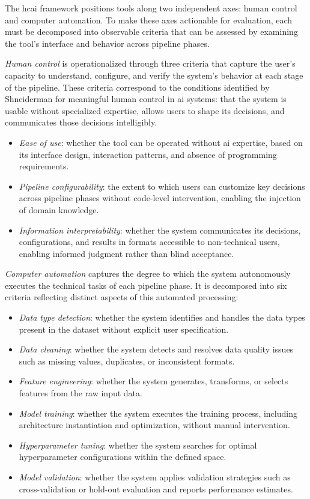 \documentclass[a4paper,twoside]{article}
\begin{document}
The \gls{hcai} framework positions tools along two independent axes: human
control and computer automation. To make these
axes actionable for evaluation, each must be decomposed into observable
criteria that can be assessed by examining the tool's interface and behavior
across pipeline phases.

\emph{Human control} is operationalized through three criteria that capture
the user's capacity to understand, configure, and verify the system's behavior
at each stage of the pipeline. These criteria correspond to the conditions
identified by Shneiderman for meaningful human control in \gls{ai} systems:
that the system is usable without specialized expertise, allows users to shape
its decisions, and communicates those decisions intelligibly.

\begin{itemize}
    \item \emph{Ease of use}: whether the tool can be operated without
    \gls{ai} expertise, based on its interface design, interaction patterns,
    and absence of programming requirements.
    \item \emph{Pipeline configurability}: the extent to which users can
    customize key decisions across pipeline phases without code-level
    intervention, enabling the injection of domain knowledge.
    \item \emph{Information interpretability}: whether the system
    communicates its decisions, configurations, and results in formats
    accessible to non-technical users, enabling informed judgment rather
    than blind acceptance.
\end{itemize}

\emph{Computer automation} captures the degree to which the system
autonomously executes the technical tasks of each pipeline phase. It is
decomposed into six criteria reflecting distinct aspects of this
automated processing:

\begin{itemize}
    \item \emph{Data type detection}: whether the system identifies and
    handles the data types present in the dataset without explicit user
    specification.
    \item \emph{Data cleaning}: whether the system detects and resolves
    data quality issues such as missing values, duplicates, or inconsistent
    formats.
    \item \emph{Feature engineering}: whether the system generates,
    transforms, or selects features from the raw input data.
    \item \emph{Model training}: whether the system executes the training
    process, including architecture instantiation and optimization, without
    manual intervention.
    \item \emph{Hyperparameter tuning}: whether the system searches for
    optimal hyperparameter configurations within the defined space.
    \item \emph{Model validation}: whether the system applies validation
    strategies such as cross-validation or hold-out evaluation and reports
    performance estimates.
\end{itemize}
\end{document}
